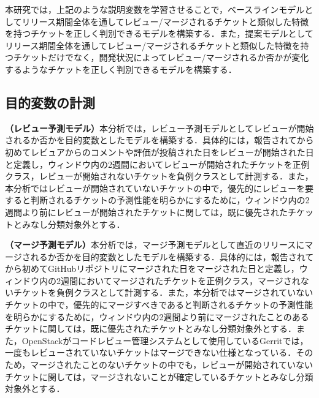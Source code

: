 \documentclass[11pt]{jreport}
\begin{document}
本研究では，上記のような説明変数を学習させることで，ベースラインモデルとしてリリース期間全体を通してレビュー/マージされるチケットと類似した特徴を持つチケットを正しく判別できるモデルを構築する．また，提案モデルとしてリリース期間全体を通してレビュー/マージされるチケットと類似した特徴を持つチケットだけでなく，開発状況によってレビュー/マージされるか否かが変化するようなチケットを正しく判別できるモデルを構築する．

\begin{table}[h]
  \caption{説明変数として計測する開発状況}
  \label{table:metrics_kaihatujoukyou}
  \centering
  \vspace{0.5zh}
\end{table}

\subsection{目的変数の計測}
\textbf{（レビュー予測モデル）}本分析では，レビュー予測モデルとしてレビューが開始されるか否かを目的変数としたモデルを構築する．具体的には，報告されてから初めてレビュアからのコメントや評価が投稿された日をレビューが開始された日と定義し，ウィンドウ内の2週間においてレビューが開始されたチケットを正例クラス，レビューが開始されないチケットを負例クラスとして計測する．また，本分析ではレビューが開始されていないチケットの中で，優先的にレビューを要すると判断されるチケットの予測性能を明らかにするために，ウィンドウ内の2週間より前にレビューが開始されたチケットに関しては，既に優先されたチケットとみなし分類対象外とする．

\textbf{（マージ予測モデル）}本分析では，マージ予測モデルとして直近のリリースにマージされるか否かを目的変数としたモデルを構築する．具体的には，報告されてから初めてGitHubリポジトリにマージされた日をマージされた日と定義し，ウィンドウ内の2週間においてマージされたチケットを正例クラス，マージされないチケットを負例クラスとして計測する．また，本分析ではマージされていないチケットの中で，優先的にマージすべきであると判断されるチケットの予測性能を明らかにするために，ウィンドウ内の2週間より前にマージされたことのあるチケットに関しては，既に優先されたチケットとみなし分類対象外とする．また，OpenStackがコードレビュー管理システムとして使用しているGerritでは，一度もレビューされていないチケットはマージできない仕様となっている．そのため，マージされたことのないチケットの中でも，レビューが開始されていないチケットに関しては，マージされないことが確定しているチケットとみなし分類対象外とする．
\end{document}
